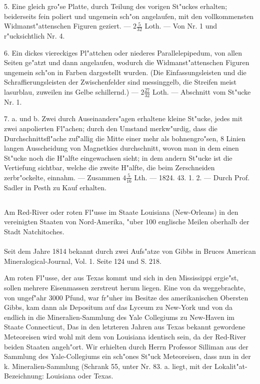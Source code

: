 \documentclass[a4paper, 11pt, oneside, polutonikogreek, german]{article}
\begin{document}
5. Eine gleich gro"se Platte, durch Teilung des vorigen St"uckes erhalten; beiderseits fein poliert und ungemein sch"on angelaufen, mit den vollkommensten Widmanst"attenschen Figuren geziert. --- $2\frac{5}{32}$ Loth. --- Von Nr. 1 und r"ucksichtlich Nr. 4.

6. Ein dickes viereckiges Pl"attchen oder niederes Parallelepipedum, von allen Seiten ge"atzt und dann angelaufen, wodurch die Widmanst"attenschen Figuren ungemein sch"on in Farben dargestellt wurden. (Die Einfassungsleisten und die Schraffierungsleisten der Zwischenfelder sind messinggelb, die Streifen meist lasurblau, zuweilen ins Gelbe schillernd.) --- $2\frac{27}{32}$ Loth. --- Abschnitt vom St"ucke Nr. 1.

7. a. und b. Zwei durch Auseinanders"agen erhaltene kleine St"ucke, jedes mit zwei anpolierten Fl"achen; durch den Umstand merkw"urdig, dass die Durchschnittsfl"ache zuf"allig die Mitte einer mehr als bohnengro"sen, 8 Linien langen Ausscheidung von Magnetkies durchschnitt, wovon man in dem einen St"ucke noch die H"alfte eingewachsen sieht; in dem andern St"ucke ist die Vertiefung sichtbar, welche die zweite H"alfte, die beim Zerschneiden zerbr"ockelte, einnahm. --- Zusammen $4\frac{5}{16}$ Lth. --- 1824. 43. 1. 2. --- Durch Prof. Sadler in Pesth zu Kauf erhalten.
\subsection{}
\begin{center}

Am Red-River oder roten Fl"usse im Staate Louisiana (New-Orleans) in den vereinigten Staaten von Nord-Amerika, "uber 100 englische Meilen oberhalb der Stadt Natchitoches.
\end{center}
\paragraph{}
Seit dem Jahre 1814 bekannt durch zwei Aufs"atze von Gibbs in Bruces American Mineralogical-Journal, Vol. 1. Seite 124 und S. 218.

\setlength{\leftskip}{10mm}
\setlength{\parindent}{0pt}

{\footnotesize Am roten Fl"usse, der aus Texas kommt und sich in den Mississippi ergie"st, sollen mehrere Eisenmassen zerstreut herum liegen. Eine von da weggebrachte, von ungef"ahr 3000 Pfund, war fr"uher im Besitze des amerikanischen Obersten Gibbs, kam dann als Depositum auf das Lyceum zu New-York und von da endlich in die Mineralien-Sammlung des Yale Collegiums zu New-Haven im Staate Connecticut, Das in den letzteren Jahren aus Texas bekannt gewordene Meteoreisen wird wohl mit dem von Louisiana identisch sein, da der Red-River beiden Staaten angeh"ort. Wir erhielten durch Herrn Professor Silliman aus der Sammlung des Yale-Collegiums ein sch"ones St"uck Meteoreisen, dass nun in der k. Mineralien-Sammlung (Schrank 55, unter Nr. 83. a. liegt, mit der Lokalit"at-Bezeichnung: Louisiana oder Texas.}
\end{document}
